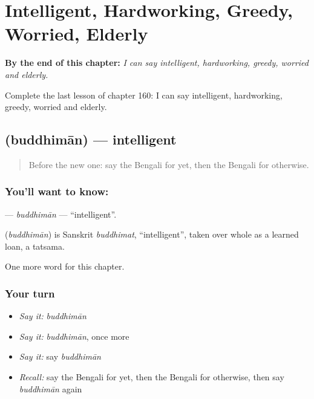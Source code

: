
\chapter{Intelligent, Hardworking, Greedy, Worried, Elderly}
\label{ch:bn-intelligent-hardworking-greedy-worried-elderly}

\begin{chapteropening}
\textbf{By the end of this chapter:} \emph{I can say intelligent, hardworking, greedy, worried and elderly.}

Complete the last lesson of chapter 160: I can say intelligent, hardworking, greedy, worried and elderly.
\end{chapteropening}

\section[\texorpdfstring{\bn{বুদ্ধিমান} (buddhimān)}{বুদ্ধিমান (buddhimān)}]{ (buddhimān) — intelligent}

\label{lesson:BN-C160-buddhiman}



\begin{quote}
Before the new one: say the Bengali for yet, then the Bengali for otherwise.
\end{quote}

\subsection*{You'll want to know: }
\textbf{} — \emph{buddhimān} — \textquotedblleft{}intelligent\textquotedblright{}.

\begin{cousinweb}
\textbf{} (\emph{buddhimān}) is Sanskrit \emph{buddhimat}, \textquotedblleft{}intelligent\textquotedblright{}, taken over whole as a learned loan, a tatsama.
\end{cousinweb}

\begin{grammarlens}[title={What you've built}]
One more word for this chapter.
\end{grammarlens}

\subsection*{Your turn}
\begin{itemize}
\raggedright
  \item \emph{Say it:} \emph{buddhimān}
  \item \emph{Say it:} \emph{buddhimān}, once more
  \item \emph{Say it:} say \emph{buddhimān}
  \item \emph{Recall:} say the Bengali for yet, then the Bengali for otherwise, then say \emph{buddhimān} again
\end{itemize}


